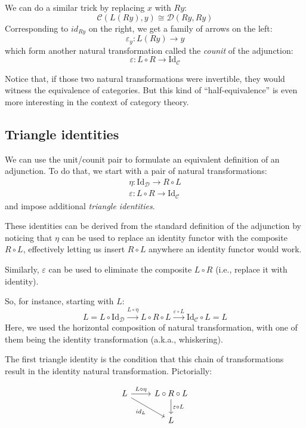 \documentclass[DaoFP]{subfiles}
\begin{document}
We can do a similar trick by replacing $x$ with $R y$:
\[  \mathcal{C} (L (R y), y) \cong \mathcal{D}( R y , R y)\]
Corresponding to $id_{R y}$ on the right, we get a family of arrows on the left:
\[ \varepsilon_y \colon L (R y) \to y \]
which form another natural transformation called the \emph{counit} of the adjunction:
\[ \varepsilon \colon L \circ R \to \text{Id}_{\mathcal{C}}  \]

Notice that, if those two natural transformations were invertible, they would witness the equivalence of categories. But this kind of ``half-equivalence'' is even more interesting in the context of category theory. 

\subsection{Triangle identities}

We can use the unit/counit pair to formulate an equivalent  definition of an adjunction. To do that, we start with a pair of natural transformations:
\begin{align*}
\eta \colon \text{Id}_{\mathcal{D}} \to R \circ L \\
\varepsilon \colon L \circ R \to \text{Id}_{\mathcal{C}} 
\end{align*}
and impose additional \emph{triangle identities}. 

These identities can be derived from the standard definition of the adjunction by noticing that $\eta$ can be used to replace an identity functor with the composite $R \circ L$, effectively letting us insert $R \circ L$ anywhere an identity functor would work.

Similarly, $\varepsilon$ can be used to eliminate the composite $L \circ R$ (i.e., replace it with identity). 

So, for instance, starting with $L$:
\[ L = L \circ \text{Id}_{\mathcal{D}} \xrightarrow{L \circ \eta} L \circ R \circ L \xrightarrow{\varepsilon \circ L} \text{Id}_{\mathcal{C}} \circ L = L \]
Here, we used the horizontal composition of natural transformation, with one of them being the identity transformation (a.k.a., whiskering).

The first triangle identity is the condition that this chain of transformations result in the identity natural transformation. Pictorially:

\[
 \begin{tikzcd}
 L
 \arrow[r, "L \circ \eta"]
 \arrow[rd, "id_L"']
 & L \circ R \circ L
 \arrow[d, "\varepsilon \circ L"]
 \\
 & L
  \end{tikzcd}
\]
\end{document}

